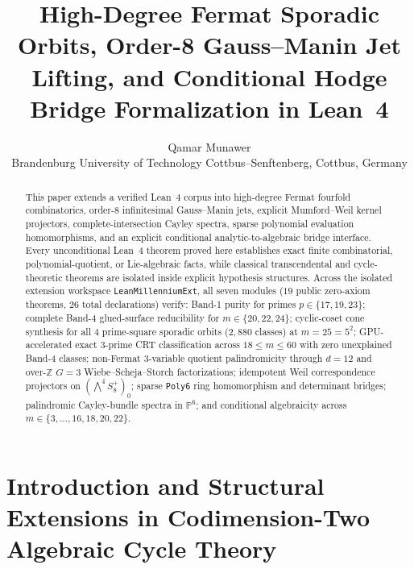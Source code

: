 \documentclass[11pt,a4paper]{article}
\title{\textbf{High-Degree Fermat Sporadic Orbits, Order-8 Gauss--Manin Jet Lifting, and Conditional Hodge Bridge Formalization in Lean~4}}
\author{
  Qamar Munawer\\
  \small Brandenburg University of Technology Cottbus--Senftenberg, Cottbus, Germany
}
\date{}
\begin{document}
\maketitle

\begin{abstract}
This paper extends a verified Lean~4 corpus into high-degree Fermat fourfold combinatorics, order-8 infinitesimal Gauss--Manin jets, explicit Mumford--Weil kernel projectors, complete-intersection Cayley spectra, sparse polynomial evaluation homomorphisms, and an explicit conditional analytic-to-algebraic bridge interface. Every unconditional Lean~4 theorem proved here establishes exact finite combinatorial, polynomial-quotient, or Lie-algebraic facts, while classical transcendental and cycle-theoretic theorems are isolated inside explicit hypothesis structures. Across the isolated extension workspace \texttt{LeanMillenniumExt}, all seven modules ($19$ public zero-axiom theorems, $26$ total declarations) verify: Band-1 purity for primes $p \in \{17, 19, 23\}$; complete Band-4 glued-surface reducibility for $m \in \{20, 22, 24\}$; cyclic-coset cone synthesis for all $4$ prime-square sporadic orbits ($2{,}880$ classes) at $m = 25 = 5^2$; GPU-accelerated exact $3$-prime CRT classification across $18 \le m \le 60$ with zero unexplained Band-4 classes; non-Fermat $3$-variable quotient palindromicity through $d = 12$ and over-$\mathbb{Z}$ $G = 3$ Wiebe--Scheja--Storch factorizations; idempotent Weil correspondence projectors on $(\bigwedge^4 S^+_8)_0$; sparse \texttt{Poly6} ring homomorphism and determinant bridges; palindromic Cayley-bundle spectra in $\mathbb{P}^6$; and conditional algebraicity across $m \in \{3,\dots,16,18,20,22\}$.
\end{abstract}

\section{Introduction and Structural Extensions in Codimension-Two Algebraic Cycle Theory}
\end{document}
